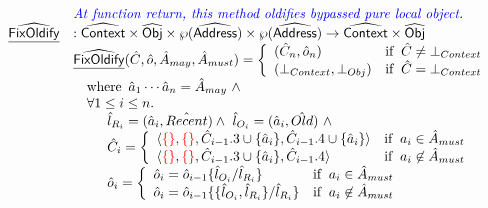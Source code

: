 \[\begin{array}{ll}
& {\color{blue} \textit{At function return, this method oldifies bypassed pure local object.}} \\
\widehat{\underline{\sf FixOldify}} & : \widehat{\mbox{\textsf{Context}}} \times \widehat{\mbox{\textsf{Obj}}} \times \wp(\widehat{\mbox{\textsf{Address}}}) \times \wp(\widehat{\mbox{\textsf{Address}}}) \rightarrow \widehat{\mbox{\textsf{Context}}} \times \widehat{\mbox{\textsf{Obj}}} \\
& \widehat{\underline{\sf FixOldify}}(\hat{C}, \hat{o}, \hat{A}_{may}, \hat{A}_{must}) =
    \left\{
      \begin{array}{ll}
        (\hat{C}_n, \hat{o}_n) & {\rm if}\begin{array}[t]{l}\hat{C} \neq \bot_{Context}\end{array} \\
        (\bot_{Context}, \bot_{Obj}) & {\rm if}\begin{array}[t]{l}\hat{C} = \bot_{Context}\end{array} \\
      \end{array}
    \right.\\
& \quad{\rm where}\begin{array}[t]{l}\hat{a}_1\cdots\hat{a}_n = \hat{A}_{may} ~ \land\end{array} \\
& \quad\forall 1 \leq i \leq n.\\
& \quad\quad \begin{array}{l}
    \hat{l}_{R_i} = (\hat{a}_i, \hat{Recent}) \land\ \hat{l}_{O_i} = (\hat{a}_i, \hat{Old})\ \land \\
    \hat{C}_i = 
    \left\{\begin{array}{ll}
      \langle {\color{red}\{ \}},
              {\color{red} \{ \}},
              \hat{C}_{i-1}.3 \cup \{\hat{a}_i\},
              \hat{C}_{i-1}.4 \cup \{\hat{a}_i\}
      \rangle & {\rm if}\begin{array}[t]{l}a_i \in \hat{A}_{must}\end{array} \\
      \langle {\color{red}\{ \}},
              {\color{red} \{ \}},
              \hat{C}_{i-1}.3 \cup \{\hat{a}_i\},
              \hat{C}_{i-1}.4 
      \rangle & {\rm if}\begin{array}[t]{l}a_i \not\in \hat{A}_{must}\end{array} \\
    \end{array}\right. \\
    \hat{o}_i = 
    \left\{\begin{array}{ll}
      \hat{o}_i = \hat{o}_{i-1}\{\hat{l}_{O_i} / \hat{l}_{R_i} \} & {\rm if}\begin{array}[t]{l}a_i \in \hat{A}_{must}\end{array} \\
      \hat{o}_i = \hat{o}_{i-1}\{\{\hat{l}_{O_i}, \hat{l}_{R_i}\} / \hat{l}_{R_i} \} & {\rm if}\begin{array}[t]{l}a_i \not\in \hat{A}_{must}\end{array}
    \end{array}\right. \\
  \end{array}\\
\\\\



\end{array}\]
